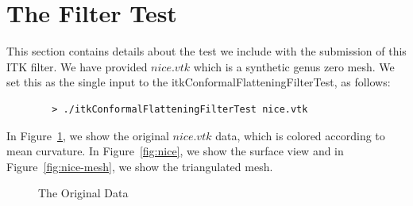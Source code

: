 \documentclass{InsightArticle}
\begin{document}
	\section{The Filter Test}
  This section contains details about the test we include with the
  submission of this ITK filter. We have provided $nice.vtk$ which is
  a synthetic genus zero mesh. We set this as the single input to the
  itkConformalFlatteningFilterTest, as follows:

	\begin{verbatim}
		> ./itkConformalFlatteningFilterTest nice.vtk
	\end{verbatim}

  \noindent In Figure~\ref{fig:original}, we show the original
  $nice.vtk$ data, which is colored according to mean curvature. In
  Figure~\ref{fig:nice}, we show the surface view and in
  Figure~\ref{fig:nice-mesh}, we show the triangulated mesh.

  \begin{figure}[t]
		\begin{center}
    \end{center}
    \vspace{-.25in} \caption{The Original Data} \label{fig:original}
  \end{figure}  
\end{document}
